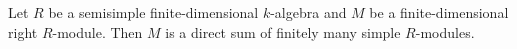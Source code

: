 Let $R$ be a semisimple finite-dimensional $k$-algebra and $M$ be a finite-dimensional
right $R$-module. Then $M$ is a direct sum of finitely many simple $R$-modules.
